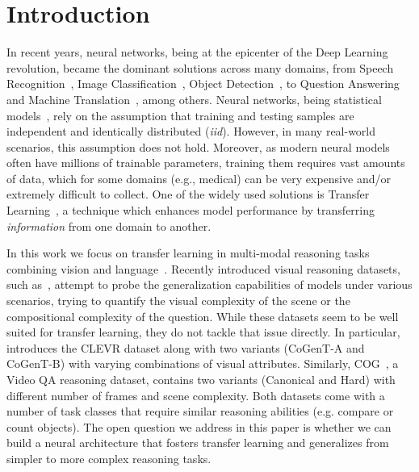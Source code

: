 \section{Introduction}
In recent years, neural networks, being at the epicenter of the Deep Learning~\cite{lecun2015deep} revolution, became the dominant solutions across many domains, from Speech Recognition~\cite{graves2013speech}, Image Classification~\cite{krizhevsky2012imagenet}, Object Detection~\cite{redmon2016you}, to Question Answering~\cite{weston2014memory} and Machine Translation~\cite{bahdanau2014neural}, among others.
Neural networks, being statistical models~\cite{ripley1993statistical,warner1996understanding}, rely on the assumption that training and testing samples are independent and identically distributed (\textit{iid}).
However, in many real-world scenarios, this assumption does not hold. Moreover, as modern neural models often have millions of trainable parameters, training them requires vast amounts of data, which for some domains (e.g., medical) can be very expensive and/or extremely difficult to collect.
One of the widely used solutions is Transfer Learning~\cite{pan2009survey,weiss2016survey}, a technique which enhances model performance by transferring \emph{information} from one domain to another.


In this work we focus on transfer learning in multi-modal reasoning tasks combining vision and language~\cite{mogadala2019trends}. Recently introduced visual reasoning datasets, such as~\cite{johnson2017clevr,yang2018dataset,song2018explore}, attempt to probe the generalization capabilities of models under various scenarios, trying to quantify the visual complexity of the scene or the compositional complexity of the question.
While these datasets seem to be well suited for transfer learning, they do not tackle that issue directly.
In particular,~\cite{johnson2017clevr} introduces the CLEVR dataset along with two variants (CoGenT-A and CoGenT-B) with varying combinations of visual attributes.
Similarly, COG~\cite{yang2018dataset}, a Video QA reasoning dataset, contains two variants (Canonical and Hard) with different number of frames and scene complexity.
Both datasets come with a number of task classes that require similar reasoning abilities (e.g. compare or count objects).
The open question we address in this paper is whether we can build a neural architecture that fosters transfer learning and generalizes from simpler to more complex reasoning tasks.


